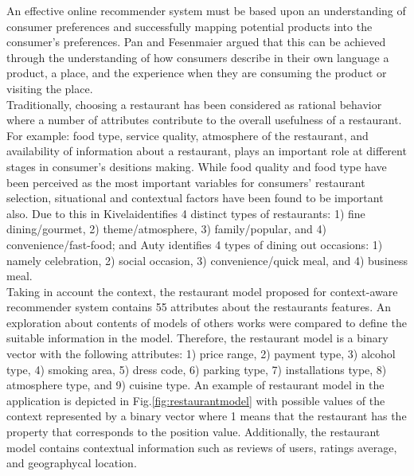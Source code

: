 An effective online recommender system must be based upon an understanding of
consumer  preferences and successfully mapping potential products into the
consumer’s preferences\cite{adomavicius2011context}. Pan and
Fesenmaier\cite{pan2006online} argued that this can be achieved through the
understanding of how consumers describe in their own language a product, a
place, and the experience when they are consuming the product or visiting the
place.\\  Traditionally, choosing a restaurant has been considered as rational
behavior where a number of attributes contribute to the overall usefulness of a
restaurant. For example: food type, service quality, atmosphere of the
restaurant, and availability of information about a restaurant, plays an
important role at different stages in consumer’s desitions
making\cite{auty1992consumer}. While food quality and food type have been
perceived as the most important variables for consumers’ restaurant selection,
situational and contextual factors have been found to be important also. Due to
this in Kivela\cite{jack1997restaurant}identifies 4 distinct types of
restaurants: 1) fine dining/gourmet, 2) theme/atmosphere, 3) family/popular, and
4) convenience/fast-food; and Auty\cite{auty1992consumer} identifies 4 types of
dining out occasions: 1) namely celebration, 2) social occasion, 3)
convenience/quick meal, and 4) business meal.\\  Taking in account the context,
the restaurant model proposed for context-aware recommender system contains 55
attributes about the restaurants features. An exploration about contents of
models of others works were compared to define the suitable information in the
model. Therefore, the restaurant model is a binary vector with the following
attributes: 1) price range, 2) payment type, 3) alcohol type, 4) smoking area,
5) dress code, 6) parking type, 7) installations type, 8) atmosphere type, and
9) cuisine type. An example of restaurant model in the application is depicted
in Fig.\ref{fig:restaurantmodel} with possible values of the context represented
by a binary vector where 1 means that the restaurant has the property that
corresponds to the position value. Additionally, the restaurant model contains
contextual information such as reviews of users, ratings average, and
geographycal location.

\begin{figure*}
\captionsetup{justification=centering,margin=2cm}
\centering
\setlength\fboxsep{0pt}
\setlength\fboxrule{0.7pt}
\caption{Example of the user interface for restaurant model.}
\label{fig:restaurantmodel}   
\end{figure*}
